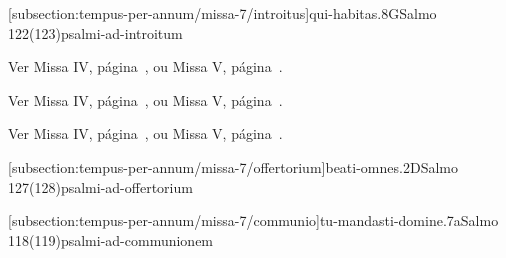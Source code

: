 \def\Prefix{subsection:tempus-per-annum/missa-7}

[\Prefix/introitus]{qui-habitas.8G}{Salmo 122(123)}{psalmi-ad-introitum}

\begin{rubrica}
  Ver Missa IV, página~\pageref{subsection:tempus-per-annum/missa-4/psalmus-responsorius}, ou Missa V, página~\pageref{subsection:tempus-per-annum/missa-5/psalmus-responsorius}.
\end{rubrica}

\begin{rubrica}
  Ver Missa IV, página~\pageref{subsection:tempus-per-annum/missa-4/alleluia}, ou Missa V, página~\pageref{subsection:tempus-per-annum/missa-5/alleluia}.
\end{rubrica}

\begin{rubrica}
  Ver Missa IV, página~\pageref{subsection:tempus-per-annum/missa-4/psalmus-alleluiaticus}, ou Missa V, página~\pageref{subsection:tempus-per-annum/missa-5/psalmus-alleluiaticus}.
\end{rubrica}

[\Prefix/offertorium]{beati-omnes.2D}{Salmo 127(128)}{psalmi-ad-offertorium}

\AllowPageFlush

[\Prefix/communio]{tu-mandasti-domine.7a}{Salmo 118(119)}{psalmi-ad-communionem}